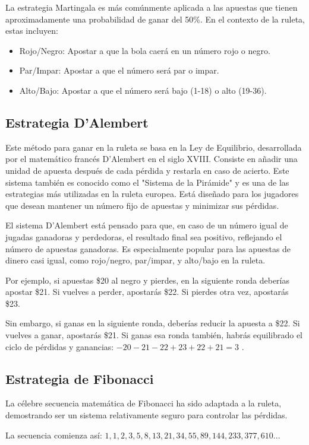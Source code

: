 \documentclass{article}
\begin{document}
La estrategia Martingala es más comúnmente aplicada a las apuestas que tienen aproximadamente una probabilidad de ganar del 50\%. En el contexto de la ruleta, estas incluyen:
\begin{itemize}
\item Rojo/Negro: Apostar a que la bola caerá en un número rojo o negro.
\item Par/Impar: Apostar a que el número será par o impar.
\item Alto/Bajo: Apostar a que el número será bajo (1-18) o alto (19-36).
\end{itemize}

\subsection{Estrategia D'Alembert}
Este método para ganar en la ruleta se basa en la Ley de Equilibrio, desarrollada por el matemático francés D'Alembert en el siglo XVIII. Consiste en añadir una unidad de apuesta después de cada pérdida y restarla en caso de acierto. Este sistema también es conocido como el "Sistema de la Pirámide" y es una de las estrategias más utilizadas en la ruleta europea. Está diseñado para los jugadores que desean mantener un número fijo de apuestas y minimizar sus pérdidas.

El sistema D'Alembert está pensado para que, en caso de un número igual de jugadas ganadoras y perdedoras, el resultado final sea positivo, reflejando el número de apuestas ganadoras. Es especialmente popular para las apuestas de dinero casi igual, como rojo/negro, par/impar, y alto/bajo en la ruleta.

Por ejemplo, si apuestas \$20 al negro y pierdes, en la siguiente ronda deberías apostar \$21. Si vuelves a perder, apostarás \$22. Si pierdes otra vez, apostarás \$23.

Sin embargo, si ganas en la siguiente ronda, deberías reducir la apuesta a \$22. Si vuelves a ganar, apostarás \$21. Si ganas esa ronda también, habrás equilibrado el ciclo de pérdidas y ganancias: $-20-21-22+23+22+21=3$ . 

\subsection{Estrategia de Fibonacci}
La célebre secuencia matemática de Fibonacci ha sido adaptada a la ruleta, demostrando ser un sistema relativamente seguro para controlar las pérdidas.

La secuencia comienza así:
$1, 1, 2, 3, 5, 8, 13, 21, 34, 55, 89, 144, 233, 377, 610...$
\end{document}
